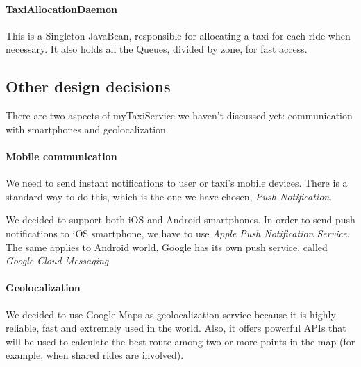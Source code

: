 \paragraph{TaxiAllocationDaemon} %
\label{par:taxiallocationdaemon}
This is a Singleton JavaBean, responsible for allocating a taxi for each ride when necessary. It also holds all the Queues, divided by zone, for fast access.

\begin{table}[h!]
\centering
{}
\end{table}


\pagebreak
\subsection{Other design decisions}
\label{sec:otherdesign}

There are two aspects of myTaxiService we haven't discussed yet: communication 
with smartphones and geolocalization.

\paragraph {Mobile communication}
We need to send instant notifications to 
user or taxi's mobile devices. There is a standard way to do this, 
which is the one we have chosen, \textit{Push Notification}.

We decided to support both iOS and Android smartphones. In order to send push
notifications to iOS smartphone, we have to use \textit{Apple Push Notification Service}.
The same applies to Android world, Google has its own push service, called 
\textit{Google Cloud Messaging}.

\paragraph {Geolocalization}
We decided to use Google Maps as geolocalization service because it is highly
reliable, fast and extremely used in the world.
Also, it offers powerful APIs that will be used to calculate the best route
among two or more points in the map (for example, when shared rides are involved).